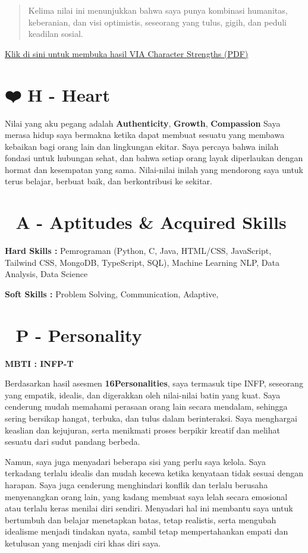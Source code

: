 \documentclass[
  letterpaper,
  DIV=11,
  numbers=noendperiod]{scrreprt}
\begin{document}
\begin{quote}
Kelima nilai ini menunjukkan bahwa saya punya kombinasi humanitas,
keberanian, dan visi optimistis, seseorang yang tulus, gigih, dan peduli
keadilan sosial.
\end{quote}

\href{../My_Shapes/StrengthsProfile-Tyara-p.pdf}{Klik di sini untuk
membuka hasil VIA Character Strengths (PDF)}

\section{❤️ H - Heart}\label{h---heart}

Nilai yang aku pegang adalah \textbf{Authenticity}, \textbf{Growth},
\textbf{Compassion} Saya merasa hidup saya bermakna ketika dapat membuat
sesuatu yang membawa kebaikan bagi orang lain dan lingkungan ekitar.
Saya percaya bahwa inilah fondasi untuk hubungan sehat, dan bahwa setiap
orang layak diperlaukan dengan hormat dan kesempatan yang sama.
Nilai-nilai inilah yang mendorong saya untuk terus belajar, berbuat
baik, dan berkontribusi ke sekitar.

\section{🧠 A - Aptitudes \& Acquired
Skills}\label{a---aptitudes-acquired-skills}

\textbf{Hard Skills :} Pemrograman (Python, C, Java, HTML/CSS,
JavaScript, Tailwind CSS, MongoDB, TypeScript, SQL), Machine Learning
NLP, Data Analysis, Data Science

\textbf{Soft Skills :} Problem Solving, Communication, Adaptive,

\section{🌿 P - Personality}\label{p---personality}

\textbf{MBTI : INFP-T}

Berdasarkan hasil asesmen \textbf{16Personalities}, saya termasuk tipe
INFP, seseorang yang empatik, idealis, dan digerakkan oleh nilai-nilai
batin yang kuat. Saya cenderung mudah memahami perasaan orang lain
secara mendalam, sehingga sering bersikap hangat, terbuka, dan tulus
dalam berinteraksi. Saya menghargai keaslian dan kejujuran, serta
menikmati proses berpikir kreatif dan melihat sesuatu dari sudut pandang
berbeda.

Namun, saya juga menyadari beberapa sisi yang perlu saya kelola. Saya
terkadang terlalu idealis dan mudah kecewa ketika kenyataan tidak sesuai
dengan harapan. Saya juga cenderung menghindari konflik dan terlalu
berusaha menyenangkan orang lain, yang kadang membuat saya lelah secara
emosional atau terlalu keras menilai diri sendiri. Menyadari hal ini
membantu saya untuk bertumbuh dan belajar menetapkan batas, tetap
realistis, serta mengubah idealisme menjadi tindakan nyata, sambil tetap
mempertahankan empati dan ketulusan yang menjadi ciri khas diri saya.
\end{document}
